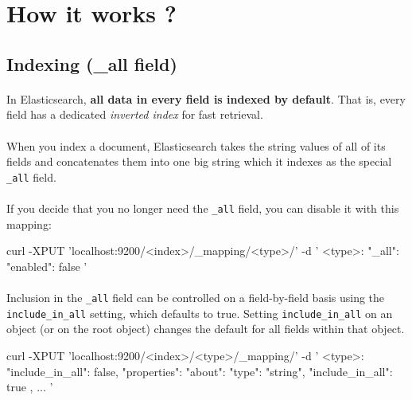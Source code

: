 \documentclass{article}%
\begin{document}
\section{How it works ?}

\subsection{Indexing (\_all field)}

\paragraph{} In Elasticsearch, \textbf{all data in every field is indexed by default}. That is, every field has a dedicated \textit{inverted index} for fast retrieval.

\paragraph{} When you index a document, Elasticsearch takes the string values of all of its fields and concatenates them into one big string which it indexes as the special \texttt{\_all} field.

\paragraph{} If you decide that you no longer need the \texttt{\_all} field, you can disable it with this mapping:

\begin{command}
curl -XPUT 'localhost:9200/<index>/_mapping/<type>/' -d '
{
    <type>: {
        "_all": { "enabled": false }
    }
}'
\end{command}

\paragraph{} Inclusion in the \texttt{\_all} field can be controlled on a field-by-field basis using the \texttt{include\_in\_all} setting, which defaults to true. Setting \texttt{include\_in\_all} on an object (or on the root object) changes the default for all fields within that object.

\begin{command}
curl -XPUT 'localhost:9200/<index>/<type>/_mapping/' -d '
{
    <type>: {
        "include_in_all": false,
        "properties": {
            "about": {
                "type": "string",
                "include_in_all": true
            },
            ...
        }
    }
}'
\end{command}
\end{document}
